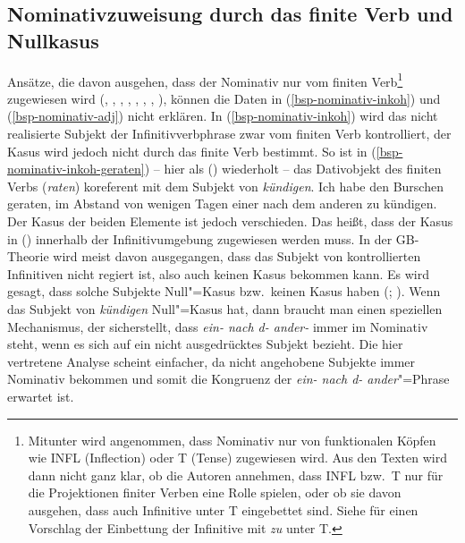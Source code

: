 \subsection{Nominativzuweisung durch das finite Verb und Nullkasus}
\label{sec-kasus-fin-verb-nullkasus}

Ansätze, die davon ausgehen, dass der Nominativ nur vom finiten Verb\footnote{
  Mitunter wird angenommen, dass Nominativ nur von funktionalen Köpfen wie INFL (Inflection) oder T (Tense) zugewiesen
  wird. Aus den Texten wird dann nicht ganz klar, ob die Autoren annehmen, dass INFL bzw.\ T nur für
  die Projektionen finiter Verben eine Rolle spielen, oder ob sie davon ausgehen, dass auch
  Infinitive unter T eingebettet sind. Siehe \citet[]{Wurmbrand2003a} für einen Vorschlag der Einbettung
  der Infinitive mit \emph{zu} unter T.%
} zugewiesen wird
%
(\citealp[]{Chomsky93a}, \citealp[]{Haider84b}, \citealp[]{FF87a},
\citealp[]{Bierwisch90a}, \citealp{Molnarfi98a},
\citealp*[]{BBM2001a}, \citealp[]{Eroms2000a}, \citealp[, , ]{Abraham2005a}), 
können die Daten in (\ref{bsp-nominativ-inkoh}) und (\ref{bsp-nominativ-adj}) nicht erklären.
In (\ref{bsp-nominativ-inkoh}) wird das nicht realisierte Subjekt der Infinitivverbphrase
zwar vom finiten Verb kontrolliert, der Kasus wird jedoch nicht durch das finite Verb
bestimmt. So ist \zb in (\ref{bsp-nominativ-inkoh-geraten}) -- hier als () wiederholt -- das Dativobjekt 
des finiten Verbs (\emph{raten}) koreferent mit dem Subjekt von \emph{kündigen}. 
\ea
Ich habe den Burschen geraten, im Abstand von wenigen Tagen einer nach dem anderen zu kündigen.
\z
Der Kasus der beiden Elemente ist jedoch verschieden. Das heißt, dass der Kasus in ()
innerhalb der Infinitivumgebung zugewiesen werden muss. In der GB-Theorie wird meist davon
ausgegangen, dass das Subjekt von kontrollierten Infinitiven nicht regiert ist, also auch
keinen Kasus bekommen kann. Es wird gesagt, dass solche Subjekte Null"=Kasus bzw.\ keinen Kasus
haben (\citealp[]{Grewendorf88a}; \citealp[]{Frey93a}).
Wenn das Subjekt von \emph{kündigen} Null"=Kasus hat,
dann braucht man einen speziellen Mechanismus, der sicherstellt,
dass \emph{ein- nach d- ander-} immer im Nominativ steht, wenn es sich auf ein nicht 
ausgedrücktes Subjekt bezieht. Die hier vertretene Analyse scheint einfacher,
da nicht angehobene Subjekte immer Nominativ bekommen und somit
die Kongruenz der \emph{ein- nach d- ander}"=Phrase erwartet ist.




